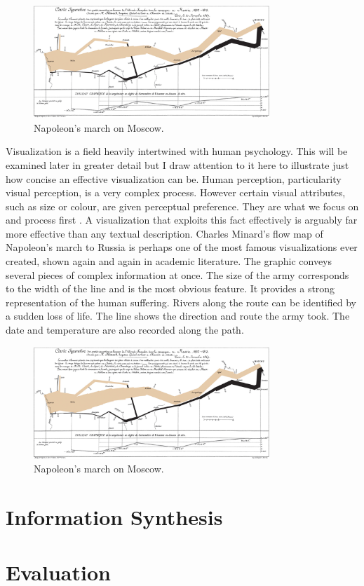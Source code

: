 \documentclass[a4paper, 10pt, titlepage, twocolumn]{article}
\begin{document}
\begin{figure}[hbt]
  \begin{center}
    \includegraphics[width=3.5in]{Minard.png}
  \end{center}
  \caption{\small Napoleon's march on Moscow.}
  \label{f:t}
\end{figure}



Visualization is a field heavily intertwined with human psychology. This will be examined later in greater detail but I draw attention to it here to illustrate just how concise an effective visualization can be. Human perception, particularity visual perception, is a very complex process. However certain visual attributes, such as size or colour, are given perceptual preference. They are what we focus on and process first \cite{mackinlay1986automating}. A visualization that exploits this fact effectively is arguably far more effective than any textual description. Charles Minard's flow map of Napoleon's march to Russia is perhaps one of the most famous visualizations ever created, shown again and again in academic literature. The graphic conveys several pieces of complex information at once. The size of the army corresponds to the width of the line and is the most obvious feature. It provides a strong representation of the human suffering. Rivers along the route can be identified by a sudden loss of life. The line shows the direction and route the army took. The date and temperature are also recorded along the path.

\begin{figure}[hbt]
  \begin{center}
    \includegraphics[width=3.5in]{Minard.png}
  \end{center}
  \caption{\small Napoleon's march on Moscow.}
  \label{f:t}
\end{figure}


\section{Information Synthesis}

\section{Evaluation}

\newpage


 


 
\end{document}
